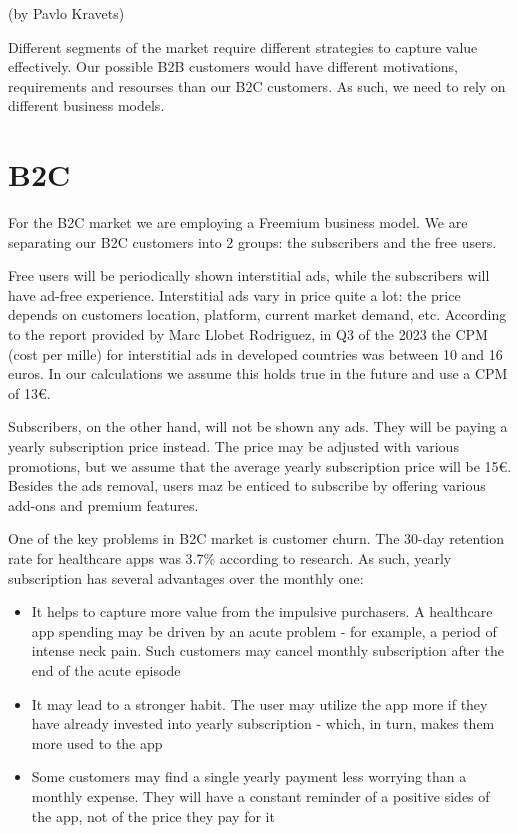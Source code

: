 (by Pavlo Kravets)

\p
Different segments of the market require different strategies to capture value effectively. Our possible B2B customers would have different motivations, requirements and resourses than our B2C customers. As such, we need to rely on different business models.

\section{B2C}

For the B2C market we are employing a Freemium business model. We are separating our B2C customers into 2 groups: the subscribers and the free users.

Free users will be periodically shown interstitial ads, while the subscribers will have ad-free experience. Interstitial ads vary in price quite a lot: the price depends on customers location, platform, current market demand, etc. According to the report provided by Marc Llobet Rodriguez\cite{ECPM}, in Q3 of the 2023 the CPM (cost per mille) for interstitial ads in developed countries was between 10 and 16 euros. In our calculations we assume this holds true in the future and use a CPM of 13€.

Subscribers, on the other hand, will not be shown any ads. They will be paying a yearly subscription price instead. The price may be adjusted with various promotions, but we assume that the average yearly subscription price will be 15€. Besides the ads removal, users maz be enticed to subscribe by offering various add-ons and premium features.

One of the key problems in B2C market is customer churn. The 30-day retention rate for healthcare apps was 3.7\% according to research\cite{churn}. As such, yearly subscription has several advantages over the monthly one:
\begin{itemize}
    \item It helps to capture more value from the impulsive purchasers. A healthcare app spending may be driven by an acute problem - for example, a period of intense neck pain. Such customers may cancel monthly subscription after the end of the acute episode
    \item It may lead to a stronger habit. The user may utilize the app more if they have already invested into yearly subscription - which, in turn, makes them more used to the app
    \item Some customers may find a single yearly payment less worrying than a monthly expense. They will have a constant reminder of a positive sides of the app, not of the price they pay for it
\end{itemize}

